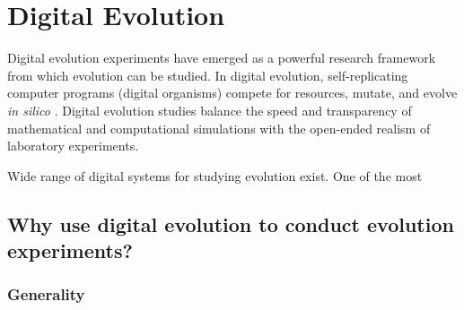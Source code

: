 \section{Digital Evolution}

Digital evolution experiments have emerged as a powerful research framework from which evolution can be studied.
In digital evolution, self-replicating computer programs (digital organisms) compete for resources, mutate, and evolve \textit{in silico} \citep{wilke_biology_2002}.
Digital evolution studies balance the speed and transparency of mathematical and computational simulations with the open-ended realism of laboratory experiments. 

Wide range of digital systems for studying evolution exist.
One of the most 




\subsection{Why use digital evolution to conduct evolution experiments?}



\subsubsection{Generality}

